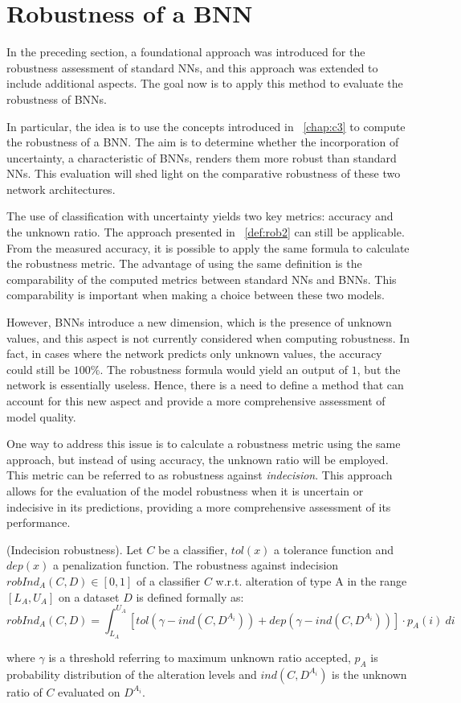 \section{Robustness of a BNN}

In the preceding section, a foundational approach was introduced for the robustness assessment of standard NNs, and this approach was extended to include additional aspects. The goal now is to apply this method to evaluate the robustness of BNNs.

In particular, the idea is to use the concepts introduced in \Chap~\ref{chap:c3} to compute the robustness of a BNN. The aim is to determine whether the incorporation of uncertainty, a characteristic of BNNs, renders them more robust than standard NNs. This evaluation will shed light on the comparative robustness of these two network architectures.

The use of classification with uncertainty yields two key metrics: accuracy and the unknown ratio. The approach presented in \Def~\ref{def:rob2} can still be applicable. From the measured accuracy, it is possible to apply the same formula to calculate the robustness metric. The advantage of using the same definition is the comparability of the computed metrics between standard NNs and BNNs. This comparability is important when making a choice between these two models.

However, BNNs introduce a new dimension, which is the presence of unknown values, and this aspect is not currently considered when computing robustness. In fact, in cases where the network predicts only unknown values, the accuracy could still be $100\%$. The robustness formula would yield an output of $1$, but the network is essentially useless. Hence, there is a need to define a method that can account for this new aspect and provide a more comprehensive assessment of model quality.

One way to address this issue is to calculate a robustness metric using the same approach, but instead of using accuracy, the unknown ratio will be employed. This metric can be referred to as robustness against \textit{indecision}. This approach allows for the evaluation of the model robustness when it is uncertain or indecisive in its predictions, providing a more comprehensive assessment of its performance.

\begin{definition} (Indecision robustness).
	Let $C$ be a classifier, $tol(x)$ a tolerance function and $dep(x)$ a penalization function.
	The robustness against indecision $robInd_A(C,D) \in [0,1]$ of a classifier $C$ w.r.t. alteration of type A in the range $[L_A, U_A]$ on a dataset $D$ is defined formally as:
	\[
		robInd_A(C,D) = \int_{L_A}^{U_A} [tol(\gamma - ind(C,D^{A_i})) + dep(\gamma - ind(C,D^{A_i}))] \cdot p_A(i)\ di
	\]
	
	where $\gamma$ is a threshold referring to maximum unknown ratio accepted, $p_A$ is probability distribution of the alteration levels and $ind(C,D^{A_i})$ is the unknown ratio of $C$ evaluated on $D^{A_i}$.
\end{definition}

